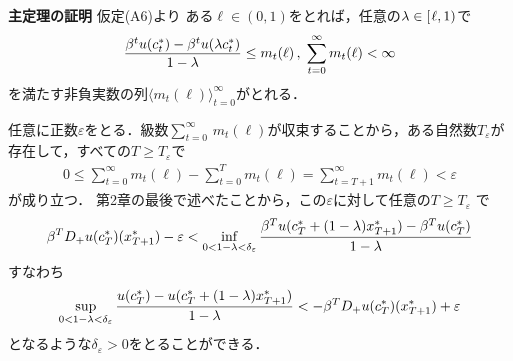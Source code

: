 \documentclass[a4paper,11pt]{jsarticle}
\DeclareRobustCommand{\lfrac}[2]{{\lower.4ex\hbox{\begingroup\ensuremath{#1}\endgroup}\over{\hspace{.2mm}#2\hspace{.2mm}}}}
\begin{document}
\vspace{7mm}

\noindent \textbf{主定理の証明}\hspace{.7mm} 仮定(A6)より
ある$\ell \in (0,1)$をとれば，任意の$\lambda \in [\hspace{.3mm}\ell,1)$で
\begin{align*}
	\lfrac{\beta^tu(c_t^*)-\beta^tu(\lambda c_t^*)}{1-\lambda}\leq m_t(\ell)\,,\;\sum_{t=0}^\infty m_t(\ell) <\infty
\end{align*}
を満たす非負実数の列$\langle m_t(\ell) \rangle_{t=0}^\infty$がとれる．

任意に正数$\varepsilon$をとる．級数${\textstyle \sum_{t=0}^\infty} \,m_t(\ell)$が収束することから，ある自然数$T_\varepsilon$が存在して，すべての$T\geq T_\varepsilon$で
\begin{align}
	0\leq \sum_{t=0}^\infty m_t(\ell)-\sum_{t=0}^T m_t(\ell)=\sum_{t=T+1}^\infty m_t(\ell)<\varepsilon
\end{align}
が成り立つ．
第2章の最後で述べたことから，この$\varepsilon$に対して任意の$T\geq T_\varepsilon$
で
\begin{align*}
	\beta^T D_{+}u(c_T^*)(x_{T+1}^*)-\varepsilon<
\inf_{0<1-\lambda<\delta_\varepsilon}\lfrac{\beta^T u(c_T^*+(1-\lambda)x_{T+1}^*)-\beta^T u(c_T^*)}{1-\lambda}
\end{align*}
すなわち
\begin{align}
\sup_{0<1-\lambda<\delta_\varepsilon}\lfrac{u(c_T^*)-u(c_T^*+(1-\lambda) x_{T+1}^*)}{1-\lambda}<-\beta^T D_{+}u(c_T^*)(x_{T+1}^*)+\varepsilon
\end{align}
となるような$\delta_\varepsilon>0$をとることができる．
\end{document}
